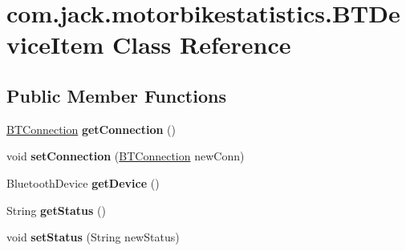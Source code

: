 \hypertarget{classcom_1_1jack_1_1motorbikestatistics_1_1_b_t_device_item}{}\section{com.\+jack.\+motorbikestatistics.\+B\+T\+Device\+Item Class Reference}
\label{classcom_1_1jack_1_1motorbikestatistics_1_1_b_t_device_item}
\subsection*{Public Member Functions}
\begin{DoxyCompactItemize}
\item 
\mbox{\label{classcom_1_1jack_1_1motorbikestatistics_1_1_b_t_device_item_ac3fbff10e5a5b3142ef648bf186b9be0}} 
\hyperlink{classcom_1_1jack_1_1motorbikestatistics_1_1_b_t_connection}{B\+T\+Connection} {\bfseries get\+Connection} ()
\item 
\mbox{\label{classcom_1_1jack_1_1motorbikestatistics_1_1_b_t_device_item_a96f7261d9eab97d74569fbc3b0da4f28}} 
void {\bfseries set\+Connection} (\hyperlink{classcom_1_1jack_1_1motorbikestatistics_1_1_b_t_connection}{B\+T\+Connection} new\+Conn)
\item 
\mbox{\label{classcom_1_1jack_1_1motorbikestatistics_1_1_b_t_device_item_aab406fd517db729f7803d48546fd1a95}} 
Bluetooth\+Device {\bfseries get\+Device} ()
\item 
\mbox{\label{classcom_1_1jack_1_1motorbikestatistics_1_1_b_t_device_item_aee33189f94c2a428ac67301b536dd004}} 
String {\bfseries get\+Status} ()
\item 
\mbox{\label{classcom_1_1jack_1_1motorbikestatistics_1_1_b_t_device_item_a4e3d0774e91c5261963b03d6dcb08561}} 
void {\bfseries set\+Status} (String new\+Status)
\item 
\mbox{\label{classcom_1_1jack_1_1motorbikestatistics_1_1_b_t_device_item_a9e16b980dbddfdb9347ffa6237b78de5}} 

\end{DoxyCompactItemize}

